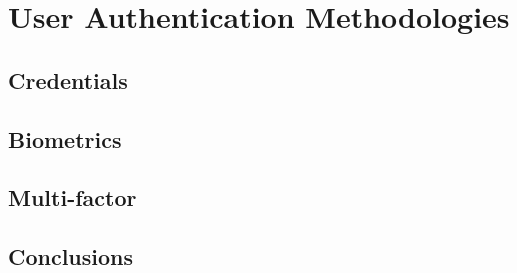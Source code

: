 \section{User Authentication Methodologies}

\subsection{Credentials}

\subsection{Biometrics}

\subsection{Multi-factor}

\subsection{Conclusions}